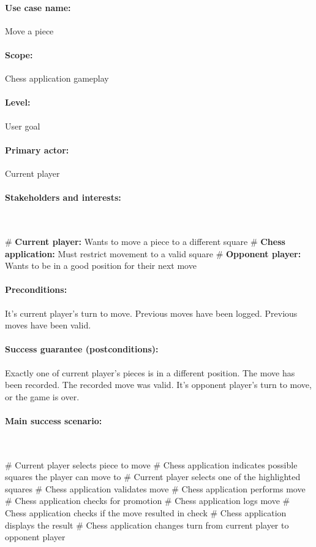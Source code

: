 \documentclass{article}
\begin{document}
\paragraph{Use case name:} Move a piece

\paragraph{Scope:} Chess application gameplay

\paragraph{Level:} User goal

\paragraph{Primary actor:} Current player

\paragraph{Stakeholders and interests:}\mbox{}\\
\begin{easylist}[itemize]
# \textbf{Current player:} Wants to move a piece to a different square
# \textbf{Chess application:} Must restrict movement to a valid square
# \textbf{Opponent player:} Wants to be in a good position for their next move
\end{easylist}

\paragraph{Preconditions:} It's current player's turn to move. Previous moves have been logged. Previous moves have been valid.

\paragraph{Success guarantee (postconditions):} Exactly one of current player's pieces is in a different position. The move has been recorded. The recorded move was valid. It's opponent player's turn to move, or the game is over.
\paragraph{Main success scenario:}\mbox{}\\
\begin{easylist}[enumerate]
# Current player selects piece to move
# Chess application indicates possible squares the player can move to
# Current player selects one of the highlighted squares
# Chess application validates move
# Chess application performs move
# Chess application checks for promotion
# Chess application logs move
# Chess application checks if the move resulted in check
# Chess application displays the result
# Chess application changes turn from current player to opponent player
\end{easylist}
\end{document}

